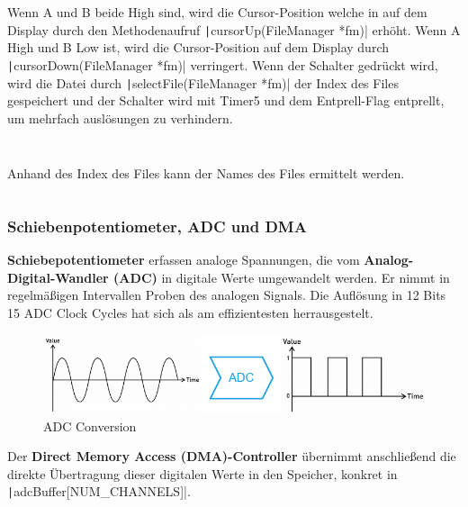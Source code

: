 Wenn A und B beide High sind, wird die Cursor-Position welche in auf dem Display durch den Methodenaufruf \texttt|cursorUp(FileManager *fm)|
erhöht. Wenn A High und B Low ist, wird die Cursor-Position auf dem Display durch \texttt|cursorDown(FileManager *fm)| verringert. Wenn der Schalter gedrückt wird, wird die Datei durch \texttt|selectFile(FileManager *fm)| der Index des Files gespeichert und der Schalter wird mit Timer5 und dem Entprell-Flag entprellt, um mehrfach auslösungen zu verhindern.
 
 \inputminted[firstline=68, lastline=74]{c}{../../f401_display_encoder_fader_test/Core/Src/filemanager.c}
 
  \inputminted[firstline=84, lastline=90]{c}{../../f401_display_encoder_fader_test/Core/Src/filemanager.c}
  
\newpage  
Anhand des Index des Files kann der Names des Files ermittelt werden.

    \inputminted[firstline=159, lastline=161]{c}{../../f401_display_encoder_fader_test/Core/Src/filemanager.c}
  
 
\subsubsection{Schiebenpotentiometer, ADC und DMA}

\textbf{Schiebepotentiometer} erfassen analoge Spannungen, die vom \textbf{Analog-Digital-Wandler (ADC)} in digitale Werte umgewandelt werden. Er nimmt in regelmäßigen Intervallen Proben des analogen Signals. Die Auflösung in 12 Bits 15 ADC Clock Cycles hat sich als am effizientesten herrausgestelt.

\begin{figure}[H]
	\centering
	\includegraphics[width=1.0\textwidth]{images/08_durchfuehrung/interface/Conversion.drawio.png}
	\caption{ADC Conversion}
	\label{fig:conversion}
\end{figure}

Der \textbf{Direct Memory Access (DMA)-Controller} übernimmt anschließend die direkte Übertragung dieser digitalen Werte in den Speicher, konkret in  \texttt|adcBuffer[NUM_CHANNELS]|.

